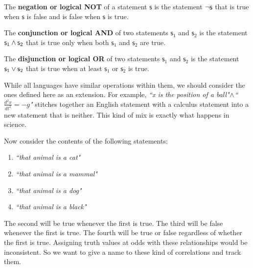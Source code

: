 \documentclass[11pt,letterpaper,fleqn]{memoir} %
\begin{document}
\begin{mathSection}
\begin{defn}
	The \textbf{negation or logical NOT} of a statement $\mathsf{s}$ is the statement $\neg\mathsf{s}$ that is true when $\mathsf{s}$ is false and is false when $\mathsf{s}$ is true.
\end{defn}

\begin{defn}
	The \textbf{conjunction or logical AND} of two statements $\mathsf{s}_1$ and $\mathsf{s}_2$ is the statement $\mathsf{s}_1 \wedge \mathsf{s}_2$ that is true only when both $\mathsf{s}_1$ and $\mathsf{s}_2$ are true.
\end{defn}

\begin{defn}
	The \textbf{disjunction or logical OR} of two statements $\mathsf{s}_1$ and $\mathsf{s}_2$ is the statement $\mathsf{s}_1 \vee \mathsf{s}_2$ that is true when at least  $\mathsf{s}_1$ or $\mathsf{s}_2$ is true.
\end{defn}
\end{mathSection}

While all languages have similar operations within them, we should consider the ones defined here as an extension. For example, \emph{``x is the position of a ball"}$\wedge$\emph{``$\frac{d^2 x}{dt^2} = - g$"} stitches together an English statement with a calculus statement into a new statement that is neither. This kind of mix is exactly what happens in science.

Now consider the contents of the following statements:
\begin{enumerate}
	\item \emph{``that animal is a cat"}
	\item \emph{``that animal is a mammal"}
	\item \emph{``that animal is a dog"}
	\item \emph{``that animal is a black"}
\end{enumerate}
The second will be true whenever the first is true. The third will be false whenever the first is true. The fourth will be true or false regardless of whether the first is true. Assigning truth values at odds with these relationships would be inconsistent. So we want to give a name to these kind of correlations and track them.
\end{document}

